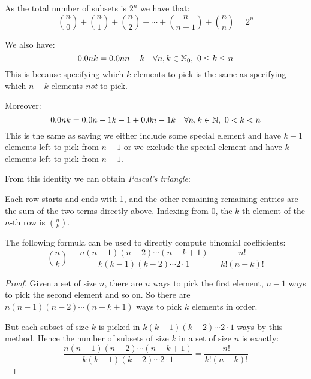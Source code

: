\documentclass[../main.tex]{subfiles}
\begin{document}
As the total number of subsets is $2^{n}$ we have that:
\[
  \binom{n}{0} + \binom{n}{1} + \binom{n}{2} + \cdots + \binom{n}{n-1} + \binom{n}{n} = 2^{n}
\]

We also have:
\[
  \binom{n}{k} = \binom{n}{n - k} \quad \forall n, k \in \N_0,\ 0 \leq k \leq n
\]
This is because specifying which $k$ elements to pick is the same as specifying which $n - k$ elements \textit{not} to pick.

Moreover:
\[
  \binom{n}{k} = \binom{n - 1}{k - 1} + \binom{n - 1}{k} \quad \forall n, k  \in \N,\ 0 < k < n
\]
This is the same as saying we either include some special element and have $k - 1$ elements left to pick from $n - 1$ or we exclude the special element and have $k$ elements left to pick from $n - 1$.

From this identity we can obtain \textit{Pascal's triangle}:
\begin{center}
\end{center}
Each row starts and ends with 1, and the other remaining remaining entries are the sum of the two terms directly above.
Indexing from 0, the $k$-th element of the $n$-th row is $\binom{n}{k}$.
\begin{proposition}
  The following formula can be used to directly compute binomial coefficients:
  \[
    \binom{n}{k} = \frac{n(n-1)(n-2)\cdots(n-k+1)}{k(k-1)(k-2)\cdots2\cdot1} = \frac{n!}{k!(n - k)!}
  \]
\end{proposition}
\begin{proof}
  Given a set of size $n$, there are $n$ ways to pick the first element, $n - 1$ ways to pick the second element and so on.
  So there are $n(n-1)(n-2)\cdots(n-k + 1)$ ways to pick $k$ elements in order.

  But each subset of size $k$ is picked in $k(k-1)(k-2)\cdots2\cdot1$ ways by this method.
  Hence the number of subsets of size $k$ in a set of size $n$ is exactly:
  \[
    \frac{n(n-1)(n-2)\cdots(n-k+1)}{k(k-1)(k-2)\cdots2\cdot1} = \frac{n!}{k!(n - k)!}
  \]
\end{proof}
\end{document}
